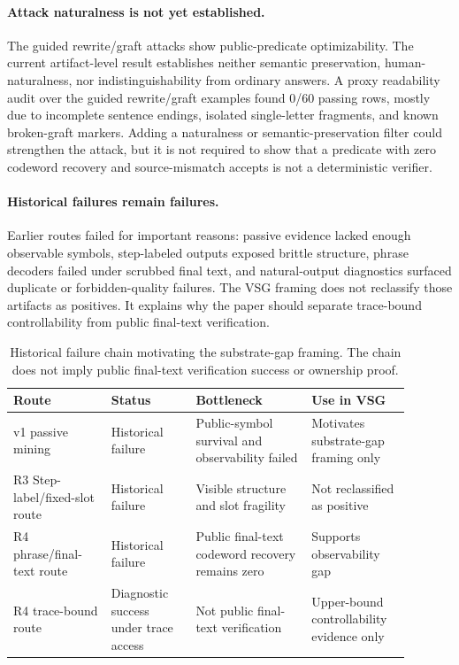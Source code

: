\paragraph{Attack naturalness is not yet established.}
The guided rewrite/graft attacks show public-predicate optimizability.  The
current artifact-level result establishes neither semantic preservation,
human-naturalness, nor indistinguishability from ordinary answers.  A proxy
readability audit over the guided rewrite/graft examples found 0/60 passing
rows, mostly due to incomplete sentence endings, isolated single-letter
fragments, and known broken-graft markers.  Adding a naturalness or
semantic-preservation filter could strengthen the attack, but it is not
required to show that a predicate with zero codeword recovery and
source-mismatch accepts is not a deterministic verifier.

\paragraph{Historical failures remain failures.}
Earlier routes failed for important reasons: passive evidence lacked enough
observable symbols, step-labeled outputs exposed brittle structure, phrase
decoders failed under scrubbed final text, and natural-output diagnostics
surfaced duplicate or forbidden-quality failures.  The VSG framing does not
reclassify those artifacts as positives.  It explains why the paper should
separate trace-bound controllability from public final-text verification.

\begin{table}[t]
\centering
\scriptsize
\setlength{\tabcolsep}{3pt}
\renewcommand{\arraystretch}{1.12}
\begin{tabular}{p{0.22\linewidth}p{0.19\linewidth}p{0.26\linewidth}p{0.22\linewidth}}
\toprule
Route & Status & Bottleneck & Use in VSG \\
\midrule
v1 passive mining & Historical failure & Public-symbol survival and observability failed & Motivates substrate-gap framing only \\
R3 Step-label/fixed-slot route & Historical failure & Visible structure and slot fragility & Not reclassified as positive \\
R4 phrase/final-text route & Historical failure & Public final-text codeword recovery remains zero & Supports observability gap \\
R4 trace-bound route & Diagnostic success under trace access & Not public final-text verification & Upper-bound controllability evidence only \\
\bottomrule
\end{tabular}
\caption{Historical failure chain motivating the substrate-gap framing.  The
chain does not imply public final-text verification success or ownership
proof.}
\label{tab:historical-chain}
\end{table}


